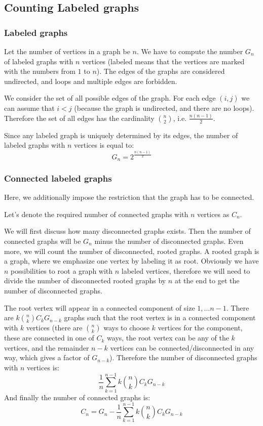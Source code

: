 \documentclass[8pt, a4paper, oneside, twocolumn]{extarticle}
\begin{document}
\subsection{Counting Labeled graphs}
\subsubsection{Labeled graphs}

Let the number of vertices in a graph be $n$. We have to compute the number $G_n$ of labeled graphs with $n$ vertices (labeled means that the vertices are marked with the numbers from $1$ to $n$). The edges of the graphs are considered undirected, and loops and multiple edges are forbidden.

We consider the set of all possible edges of the graph. For each edge $(i, j)$ we can assume that $i < j$ (because the graph is undirected, and there are no loops). Therefore the set of all edges has the cardinality $\binom{n}{2}$, i.e. $\frac{n(n-1)}{2}$.

Since any labeled graph is uniquely determined by its edges, the number of labeled graphs with $n$ vertices is equal to: $$G_n = 2^{\frac{n(n-1)}{2}}$$
\subsubsection{Connected labeled graphs}

Here, we additionally impose the restriction that the graph has to be connected.

Let's denote the required number of connected graphs with $n$ vertices as $C_n$.

We will first discuss how many disconnected graphs exists. Then the number of connected graphs will be $G_n$ minus the number of disconnected graphs. Even more, we will count the number of disconnected, rooted graphs. A rooted graph is a graph, where we emphasize one vertex by labeling it as root. Obviously we have $n$ possibilities to root a graph with $n$ labeled vertices, therefore we will need to divide the number of disconnected rooted graphs by $n$ at the end to get the number of disconnected graphs.

The root vertex will appear in a connected component of size $1, \dots n-1$. There are $k \binom{n}{k} C_k G_{n-k}$ graphs such that the root vertex is in a connected component with $k$ vertices (there are $\binom{n}{k}$ ways to choose $k$ vertices for the component, these are connected in one of $C_k$ ways, the root vertex can be any of the $k$ vertices, and the remainder $n-k$ vertices can be connected/disconnected in any way, which gives a factor of $G_{n-k}$). Therefore the number of disconnected graphs with $n$ vertices is: $$\frac{1}{n} \sum_{k=1}^{n-1} k \binom{n}{k} C_k G_{n-k}$$ And finally the number of connected graphs is: $$C_n = G_n - \frac{1}{n} \sum_{k=1}^{n-1} k \binom{n}{k} C_k G_{n-k}$$
\end{document}
